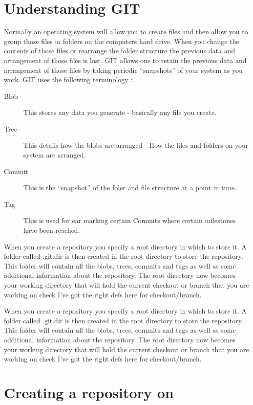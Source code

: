 \section{Understanding GIT}

Normally an operating system will allow you to create files and then allow you to group those files in folders on the computers hard drive. When you change the contents of those files or rearrange the folder structure the previous data and arrangement of those files is lost. GIT allows one to retain the previous data and arrangement of those files by taking periodic ``snapshots'' of your system as you work. GIT uses the following terminology : 
\begin{description}
\item[Blob] This stores any data you generate - basically any file you create.
\item[Tree] This details how the blobs are arranged - How the files and folders on your system are arranged.
\item[Commit] This is the ``snapshot'' of the foler and file structure at a point in time.
\item[Tag] This is used for ear marking certain Commits where certain milestones have been reached.
\end{description}

When you create a repository you specify a root directory in which to store it. A folder called .git.dir is then created in the root directory to store the repository. This folder will contain all the blobs, trees, commits and tags as well as some additional information about the repository. The root directory now becomes your working directory that will hold the current checkout or branch that you are working on \ed check I've got the right defs here for checkout/branch\ed. 

When you create a repository you specify a root directory in which to store it. A folder called .git.dir is then created in the root directory to store the repository. This folder will contain all the blobs, trees, commits and tags as well as some additional information about the repository. The root directory now becomes your working directory that will hold the current checkout or branch that you are working on \ed check I've got the right defs here for checkout/branch\ed.  

\section{Creating a repository on \gh}

